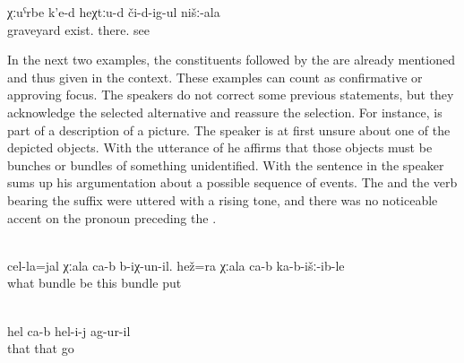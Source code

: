 \begin{exe}
	\ex	\label{ex:‎Up there the graveyard of ours is visible}
	\gll	χːuˁrbe	k'e-d	heχtːu-d	či-d-ig-ul	nišː-ala\\
		graveyard	exist.	there.	see	\\
	\glt	{}
\end{exe}

In the next two examples, the constituents followed by the  are already mentioned and thus given in the context. These examples can count as confirmative or approving focus. The speakers do not correct some previous statements, but they acknowledge the selected alternative and reassure the selection. For instance,  is part of a description of a picture. The speaker is at first unsure about one of the depicted objects. With the utterance of  he affirms that those objects must be bunches or bundles of something unidentified. With the sentence in  the speaker sums up his argumentation about a possible sequence of events. The  and the verb bearing the  suffix were uttered with a rising tone, and there was no noticeable accent on the pronoun preceding the .
%
\begin{exe}
		\\\label{ex:This is a BUNDLE of something. This BUNDLE also has been put down (there)@27a}%
		\gll	cel-la=jal	χːala	ca-b	b-iχ-un-il. 	hež=ra	χːala	ca-b	ka-b-išː-ib-le\\
			what	bundle		be 	this	bundle		put\\
		\glt	{}

		\\\label{ex:This is it what has happened to him@27b}
		\gll	hel	ca-b	hel-i-j	ag-ur-il\\
			that		that	go\\
		\glt	{}
\end{exe}

